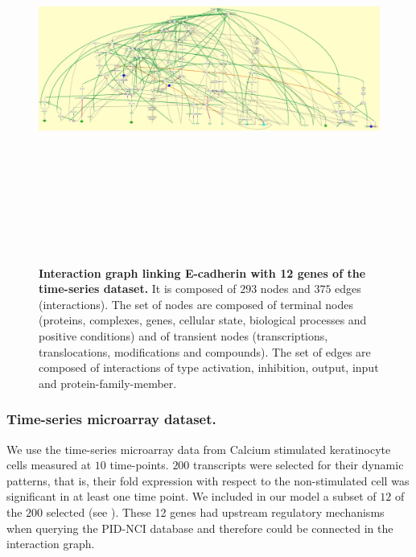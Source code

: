 \begin{figure}[!p]
 \centering
 \includegraphics[width=7.5in, height=5in, angle=-90]{images/net.jpg}
\caption{{\bf  Interaction graph linking E-cadherin with 12 genes of the time-series dataset.} It is composed of $293$ nodes and $375$ edges (interactions).
The set of nodes are composed of terminal nodes (proteins, complexes, genes, cellular state, biological processes and positive conditions) and of transient
nodes (transcriptions, translocations, modifications and compounds). The set of edges are composed of interactions of type activation, inhibition, output, 
input and protein-family-member.} 
 \label{fig:network}
\end{figure}

\subsubsection{Time-series microarray dataset.}
\label{SECTSD}
We use the time-series microarray data from Calcium stimulated keratinocyte cells 
 measured at $10$ time-points. $200$ transcripts were selected for their dynamic patterns,
that is, their fold expression with respect to the non-stimulated cell was significant in at least one time point. 
We included in our model a subset of $12$ of the $200$ selected (see ).  
These 12 genes had upstream regulatory mechanisms when querying the 
PID-NCI database and therefore could be connected in the interaction graph.

